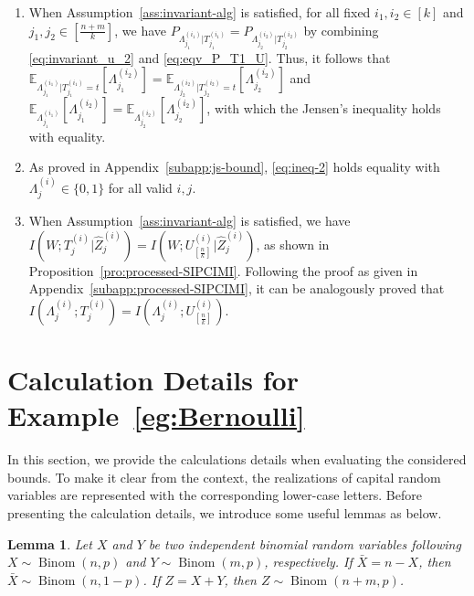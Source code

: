 \documentclass[onecolumn,romanappendices,10pt]{IEEEtran}
\newtheorem{lemma}{Lemma}
\newcommand{\EE}{{\mathbb{E}}}
\DeclareMathOperator{\Binomial}{Binom}
\begin{document}
	\begin{enumerate}
		\item[\eqref{eq:ineq-1}] When Assumption~\ref{ass:invariant-alg} is satisfied, for all fixed $i_1,i_2 \in [k]$ and $j_1,j_2 \in [\frac{n+m}{k}]$, we have $P_{\Lambda^{(i_1)}_{j_1} | T^{(i_1)}_{j_1}} = P_{\Lambda^{(i_2)}_{j_2} | T^{(i_2)}_{j_2}}$ by combining \eqref{eq:invariant_u_2} and \eqref{eq:eqv_P_T1_U}. Thus, it follows that $\EE_{\Lambda^{(i_1)}_{j_1} | T^{(i_1)}_{j_1} = t} \left[ \Lambda^{(i_2)}_{j_1} \right] = \EE_{\Lambda^{(i_2)}_{j_2} | T^{(i_2)}_{j_2} = t} \left[ \Lambda^{(i_2)}_{j_2} \right]$ and $\EE_{\Lambda^{(i_1)}_{j_1}} \left[ \Lambda^{(i_2)}_{j_1} \right] = \EE_{\Lambda^{(i_2)}_{j_2}} \left[ \Lambda^{(i_2)}_{j_2} \right]$, with which the Jensen's inequality holds with equality.
		\item[\eqref{eq:ineq-2}] As proved in Appendix~\ref{subapp:js-bound}, \eqref{eq:ineq-2} holds equality with $\Lambda^{(i)}_j \in \{0, 1\}$ for all valid $i,j$. 
		\item[\eqref{eq:ineq-3}] When Assumption~\ref{ass:invariant-alg} is satisfied, we have $I ( W; T^{(i)}_j | \hat{Z}^{(i)}_j ) = I ( W; U^{(i)}_{[\frac{n}{k}]} | \hat{Z}^{(i)}_j )$, as shown in Proposition~\ref{pro:processed-SIPCIMI}. Following the proof as given in Appendix~\ref{subapp:processed-SIPCIMI}, it can be analogously proved that $I ( \Lambda^{(i)}_j; T^{(i)}_j ) = I ( \Lambda^{(i)}_j; U^{(i)}_{[\frac{n}{k}]} )$.
	\end{enumerate}
	\newpage
	
	\section{Calculation Details for Example~\ref{eg:Bernoulli}}\label{app:calculations}
	\setcounter{subsection}{0}
	In this section, we provide the calculations details when evaluating the considered bounds. To make it clear from the context, the realizations of capital random variables are represented with the corresponding lower-case letters. Before presenting the calculation details, we introduce some useful lemmas as below.
	\begin{lemma} \label{lem:bin_coe_pro}
		Let $X$ and $Y$ be two independent binomial random variables following $X \sim \Binomial(n, p)$ and $Y \sim \Binomial(m, p)$, respectively. If $\bar{X} = n - X$, then $\bar{X} \sim \Binomial(n, 1 - p)$. If $Z = X + Y$, then $Z \sim \Binomial(n + m, p)$.
	\end{lemma}
	
\end{document}
